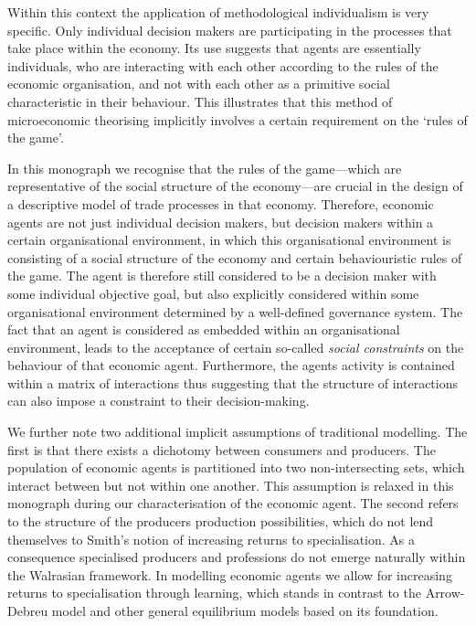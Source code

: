 Within this context the application of methodological individualism is very specific. Only individual decision makers are participating in the processes that take place within the economy. Its use suggests that agents are essentially individuals, who are interacting with each other according to the rules of the economic organisation, and not with each other as a primitive social characteristic in their behaviour. This illustrates that this method of microeconomic theorising implicitly involves a certain requirement on the `rules of the game'. 

In this monograph we recognise that the rules of the game---which are representative of the social structure of the economy---are crucial in the design of a descriptive model of trade processes in that economy. Therefore, economic agents are not just individual decision makers, but decision makers within a certain organisational environment, in which this organisational environment is consisting of a social structure of the economy and certain behaviouristic rules of the game. The agent is therefore still considered to be a decision maker with some individual objective goal, but also explicitly considered within some organisational environment determined by a well-defined governance system. The fact that an agent is considered as embedded within an organisational environment, leads to the acceptance of certain so-called \emph{social constraints} on the behaviour of that economic agent. Furthermore, the agents activity is contained within a matrix of interactions thus suggesting that the structure of interactions can also impose a constraint to their decision-making.

We further note two additional implicit assumptions of traditional modelling. The first is that there exists a dichotomy between consumers and producers. The population of economic agents is partitioned into two non-intersecting sets, which interact between but not within one another. This assumption is relaxed in this monograph during our characterisation of the economic agent. The second refers to the structure of the producers production possibilities, which do not lend themselves to Smith's notion of increasing returns to specialisation. As a consequence specialised producers and professions do not emerge naturally within the Walrasian framework. In modelling economic agents we allow for increasing returns to specialisation through learning, which stands in contrast to the Arrow-Debreu model and other general equilibrium models based on its foundation.

